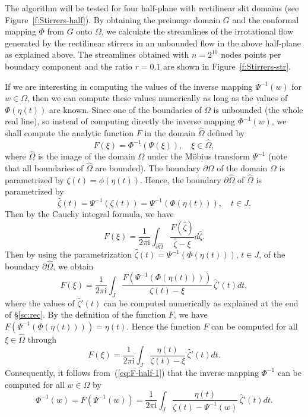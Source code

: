 \documentclass[11pt,a4paper]{article}
\renewcommand{\i}{\mathrm{i}}
\renewcommand{\i}{\mathrm{i}}
\begin{document}
The algorithm will be tested for four half-plane with rectilinear slit domains (see Figure~\ref{f:Stirrers-half}). By obtaining the preimage domain $G$ and the conformal mapping $\Phi$ from $G$ onto $\Omega$, we calculate the streamlines of the irrotational flow generated by the rectilinear stirrers in an unbounded flow in the above half-plane as explained above. The streamlines obtained with $n=2^{10}$ nodes points per boundary component and the ratio $r=0.1$ are shown in Figure~\ref{f:Stirrers-str}. 

If we are interesting in computing the values of the inverse mapping $\Psi^{-1}(w)$ for $w\in\Omega$, then we can compute these values numerically as long as the values of $\Phi(\eta(t))$ are known.  
Since one of the boundaries of $\Omega$ is unbounded (the whole real line), so instead of computing directly the inverse mapping $\Phi^{-1}(w)$, we shall compute the analytic function $F$ in the domain $\hat\Omega$ defined by
\begin{equation}\label{eq:F-half-1}
F(\xi)=\Phi^{-1}(\Psi(\xi)), \quad \xi\in\hat\Omega,
\end{equation}
where $\hat\Omega$ is the image of the domain $\Omega$ under the M\"obius transform $\Psi^{-1}$ (note that all boundaries of $\hat\Omega$ are bounded). The boundary $\partial\Omega$ of the domain $\Omega$ is parametrized by $\zeta(t)=\phi(\eta(t))$. Hence, the boundary $\partial\hat\Omega$ of $\hat\Omega$ is parametrized by
\begin{equation}\label{eq:h-zeta}
\hat\zeta(t)=\Psi^{-1}(\zeta(t))=\Psi^{-1}(\Phi(\eta(t))), \quad t\in J.
\end{equation}
Then by the Cauchy integral formula, we have
\begin{equation}\label{eq:F-half-2}
F(\xi)=\frac{1}{2\pi\i}\int_{\partial\hat\Omega}\frac{F(\hat\zeta)}{\hat\zeta-\xi}d\hat\zeta.
\end{equation}
Then by using the parametrization $\hat\zeta(t)=\Psi^{-1}(\Phi(\eta(t)))$, $t\in J$, of the boundary $\partial\hat\Omega$, we obtain
\begin{equation}\label{eq:F-half-3}
F(\xi)=\frac{1}{2\pi\i}\int_{J}\frac{F(\Psi^{-1}(\Phi(\eta(t))))}{\zeta(t)-\xi}\,\hat\zeta'(t)dt,
\end{equation}
where the values of $\hat\zeta'(t)$ can be computed numerically as explained at the end of \S\ref{sc:rec}.
By the definition of the function $F$, we have $F(\Psi^{-1}(\Phi(\eta(t))))=\eta(t)$. Hence the function $F$ can be computed for all $\xi\in\hat\Omega$ through
\begin{equation}\label{eq:F-half-4}
F(\xi)=\frac{1}{2\pi\i}\int_{J}\frac{\eta(t)}{\zeta(t)-\xi}\,\hat\zeta'(t)dt.
\end{equation}
Consequently, it follows from~(\ref{eq:F-half-1}) that the inverse mapping $\Phi^{-1}$ can be computed for all $w\in\Omega$ by
\begin{equation}\label{eq:Phi-1}
\Phi^{-1}(w)=F(\Psi^{-1}(w))
=\frac{1}{2\pi\i}\int_{J}\frac{\eta(t)}{\zeta(t)-\Psi^{-1}(w)}\,\hat\zeta'(t)dt.
\end{equation}
\end{document}
